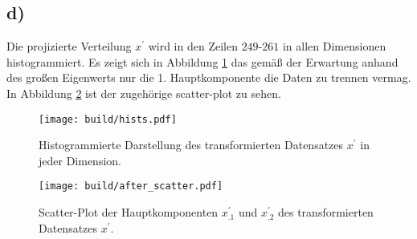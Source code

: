 \subsection*{d)}
Die projizierte Verteilung $x^{\prime}$ wird in den Zeilen $249$-$261$ in allen Dimensionen histogrammiert. 
Es zeigt sich in Abbildung \ref{fig:hists} das gemäß der Erwartung anhand des großen Eigenwerts nur die 1. Hauptkomponente die Daten zu trennen vermag.
In Abbildung \ref{fig:after_scatter} ist der zugehörige scatter-plot zu sehen.
\begin{figure}
\centering
\texttt{[image: build/hists.pdf]}
\caption{Histogrammierte Darstellung des transformierten Datensatzes $x^{\prime}$ in jeder Dimension.}
\label{fig:hists}
\end{figure}
\begin{figure}
\centering
\texttt{[image: build/after\_scatter.pdf]}
\caption{Scatter-Plot der Hauptkomponenten $x_.1^{\prime}$ und $x_.2^{\prime}$ des transformierten Datensatzes $x^{\prime}$.}
\label{fig:after_scatter}
\end{figure}
